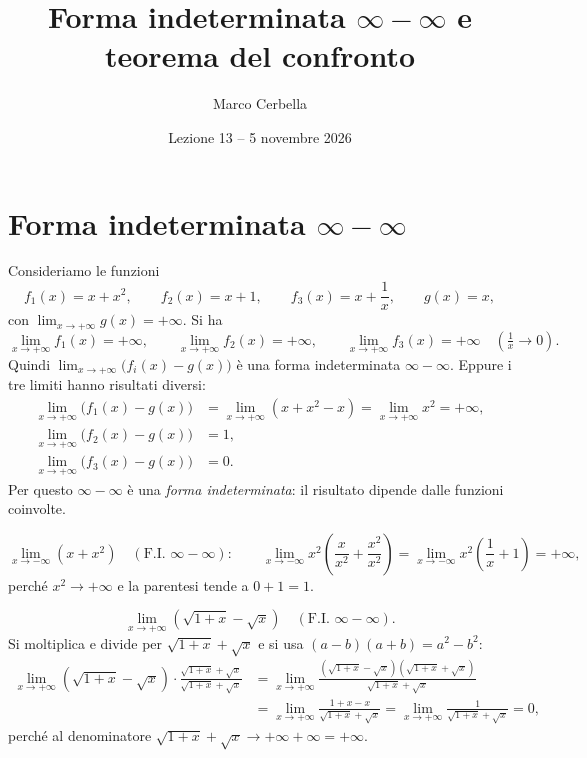 \documentclass[11pt,a4paper]{article}
\title{Forma indeterminata $\infty-\infty$ e teorema del confronto}
\author{Marco Cerbella}
\date{Lezione 13 -- 5 novembre 2026}
\begin{document}
\maketitle

\section{Forma indeterminata $\infty - \infty$}

Consideriamo le funzioni
\[
f_1(x) = x + x^2, \qquad f_2(x) = x + 1, \qquad f_3(x) = x + \frac{1}{x}, \qquad g(x) = x,
\]
con $\displaystyle\lim_{x\to+\infty} g(x) = +\infty$. Si ha
\[
\lim_{x\to+\infty} f_1(x) = +\infty, \qquad \lim_{x\to+\infty} f_2(x) = +\infty, \qquad \lim_{x\to+\infty} f_3(x) = +\infty \quad\left(\tfrac{1}{x} \to 0\right).
\]
Quindi $\displaystyle\lim_{x\to+\infty}\big(f_i(x) - g(x)\big)$ è una forma indeterminata $\infty - \infty$. Eppure i tre limiti hanno risultati diversi:
\begin{align*}
  \lim_{x\to+\infty}\big(f_1(x) - g(x)\big) &= \lim_{x\to+\infty}(x + x^2 - x) = \lim_{x\to+\infty} x^2 = +\infty,\\
  \lim_{x\to+\infty}\big(f_2(x) - g(x)\big) &= 1,\\
  \lim_{x\to+\infty}\big(f_3(x) - g(x)\big) &= 0 .
\end{align*}
Per questo $\infty - \infty$ è una \emph{forma indeterminata}: il risultato dipende dalle funzioni coinvolte.

\begin{esempio}[Raccoglimento]
\[
\lim_{x\to-\infty}\left(x + x^2\right) \quad (\text{F.I. } \infty - \infty): \qquad
\lim_{x\to-\infty} x^2\left(\frac{x}{x^2} + \frac{x^2}{x^2}\right) = \lim_{x\to-\infty} x^2\left(\frac{1}{x} + 1\right) = +\infty ,
\]
perché $x^2 \to +\infty$ e la parentesi tende a $0 + 1 = 1$.
\end{esempio}

\begin{esempio}[Razionalizzazione]
\[
\lim_{x\to+\infty}\left(\sqrt{1 + x} - \sqrt{x}\right) \quad (\text{F.I. } \infty - \infty).
\]
Si moltiplica e divide per $\sqrt{1 + x} + \sqrt{x}$ e si usa $(a - b)(a + b) = a^2 - b^2$:
\begin{align*}
  \lim_{x\to+\infty}\left(\sqrt{1+x} - \sqrt{x}\right)\cdot\frac{\sqrt{1+x} + \sqrt{x}}{\sqrt{1+x} + \sqrt{x}}
  &= \lim_{x\to+\infty}\frac{\left(\sqrt{1+x} - \sqrt{x}\right)\left(\sqrt{1+x} + \sqrt{x}\right)}{\sqrt{1+x} + \sqrt{x}}\\
  &= \lim_{x\to+\infty}\frac{1 + x - x}{\sqrt{1+x} + \sqrt{x}}
   = \lim_{x\to+\infty}\frac{1}{\sqrt{1+x} + \sqrt{x}} = 0,
\end{align*}
perché al denominatore $\sqrt{1+x} + \sqrt{x} \to +\infty + \infty = +\infty$.
\end{esempio}
\end{document}
